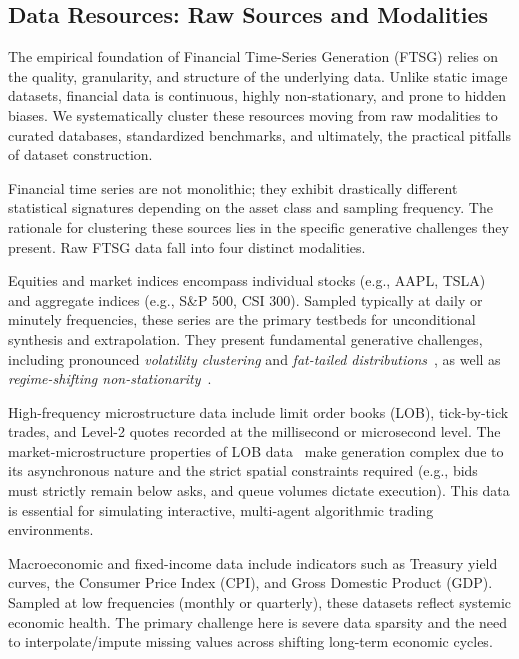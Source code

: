 \subsection{Data Resources: Raw Sources and Modalities}
\label{sec:data_resources}

The empirical foundation of Financial Time-Series Generation (FTSG) relies on the quality, granularity, and structure of the underlying data. Unlike static image datasets, financial data is continuous, highly non-stationary, and prone to hidden biases. We systematically cluster these resources moving from raw modalities to curated databases, standardized benchmarks, and ultimately, the practical pitfalls of dataset construction.

Financial time series are not monolithic; they exhibit drastically different statistical signatures depending on the asset class and sampling frequency. The rationale for clustering these sources lies in the specific generative challenges they present. Raw FTSG data fall into four distinct modalities.

Equities and market indices encompass individual stocks (e.g., AAPL, TSLA) and aggregate indices (e.g., S\&P 500, CSI 300). Sampled typically at daily or minutely frequencies, these series are the primary testbeds for unconditional synthesis and extrapolation. They present fundamental generative challenges, including pronounced \textit{volatility clustering} and \textit{fat-tailed distributions}~\citep{cont2001empirical}, as well as \textit{regime-shifting non-stationarity}~\citep{hamilton1989new}.

High-frequency microstructure data include limit order books (LOB), tick-by-tick trades, and Level-2 quotes recorded at the millisecond or microsecond level. The market-microstructure properties of LOB data~\citep{ohara1995market,gould2013limit} make generation complex due to its asynchronous nature and the strict spatial constraints required (e.g., bids must strictly remain below asks, and queue volumes dictate execution). This data is essential for simulating interactive, multi-agent algorithmic trading environments.

Macroeconomic and fixed-income data include indicators such as Treasury yield curves, the Consumer Price Index (CPI), and Gross Domestic Product (GDP). Sampled at low frequencies (monthly or quarterly), these datasets reflect systemic economic health. The primary challenge here is severe data sparsity and the need to interpolate/impute missing values across shifting long-term economic cycles.

